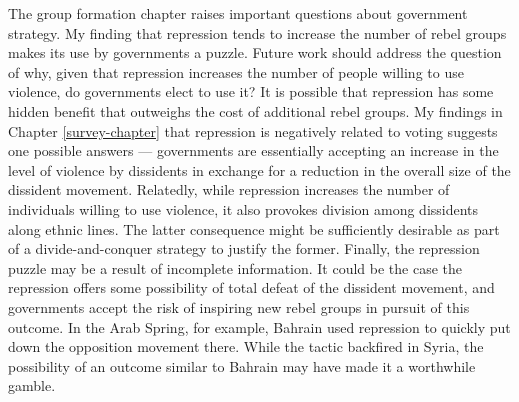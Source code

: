 \documentclass[12pt,]{book}
\theoremstyle{definition}
\theoremstyle{definition}
\theoremstyle{definition}
\theoremstyle{remark}
\begin{document}
The group formation chapter raises important questions about government
strategy. My finding that repression tends to increase the number of
rebel groups makes its use by governments a puzzle. Future work should
address the question of why, given that repression increases the number
of people willing to use violence, do governments elect to use it? It is
possible that repression has some hidden benefit that outweighs the cost
of additional rebel groups. My findings in Chapter \ref{survey-chapter}
that repression is negatively related to voting suggests one possible
answers --- governments are essentially accepting an increase in the
level of violence by dissidents in exchange for a reduction in the
overall size of the dissident movement. Relatedly, while repression
increases the number of individuals willing to use violence, it also
provokes division among dissidents along ethnic lines. The latter
consequence might be sufficiently desirable as part of a
divide-and-conquer strategy to justify the former. Finally, the
repression puzzle may be a result of incomplete information. It could be
the case the repression offers some possibility of total defeat of the
dissident movement, and governments accept the risk of inspiring new
rebel groups in pursuit of this outcome. In the Arab Spring, for
example, Bahrain used repression to quickly put down the opposition
movement there. While the tactic backfired in Syria, the possibility of
an outcome similar to Bahrain may have made it a worthwhile gamble.
\end{document}
